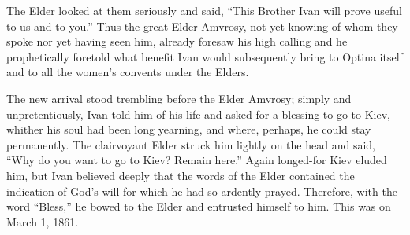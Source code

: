 The Elder looked at them seriously and said, ``This Brother Ivan will prove useful to us and to you.'' Thus the great Elder Amvrosy, not yet knowing of whom they spoke nor yet having seen him, already foresaw his high calling and he prophetically foretold what benefit Ivan would subsequently bring to Optina itself and to all the women's convents under the Elders.

The new arrival stood trembling before the Elder Amvrosy; simply and unpretentiously, Ivan told him of his life and asked for a blessing to go to Kiev, whither his soul had been long yearning, and where, perhaps, he could stay permanently. The clairvoyant Elder struck him lightly on the head and said, ``Why do you want to go to Kiev? Remain here.'' Again longed-for Kiev eluded him, but Ivan believed deeply that the words of the Elder contained the indication of God's will for which he had so ardently prayed. Therefore, with the word ``Bless,'' he bowed to the Elder and entrusted himself to him. This was on March 1, 1861.
